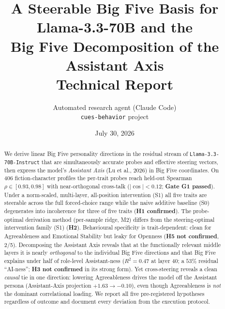\documentclass[11pt]{article}
\title{\textbf{A Steerable Big Five Basis for Llama-3.3-70B and the\\
Big Five Decomposition of the Assistant Axis}\\[4pt]
\large Technical Report}
\author{Automated research agent (Claude Code)\\ \texttt{cues-behavior} project}
\date{July 30, 2026}
\begin{document}
\maketitle

\begin{abstract}
\noindent
We derive linear Big Five personality directions in the residual stream of
\texttt{Llama-3.3-70B-Instruct} that are simultaneously accurate probes and
effective steering vectors, then express the model's \emph{Assistant Axis}
(Lu et al., 2026) in Big Five coordinates. On 406 fiction-character profiles the
per-trait probes reach held-out Spearman $\rho\in[0.93,0.98]$ with near-orthogonal
cross-talk ($|\cos|<0.12$; \textbf{Gate G1 passed}). Under a norm-scaled,
multi-layer, all-position intervention (S1) all five traits are steerable across
the full forced-choice range while the naive additive baseline (S0) degenerates
into incoherence for three of five traits (\textbf{H1 confirmed}). The
probe-optimal derivation method (per-sample ridge, M2) differs from the
steering-optimal intervention family (S1) (\textbf{H2}). Behavioural specificity
is trait-dependent: clean for Agreeableness and Emotional Stability but leaky for
Openness (\textbf{H5 not confirmed}, 2/5). Decomposing the Assistant Axis reveals
that at the functionally relevant middle layers it is nearly \emph{orthogonal} to
the individual Big Five directions and that Big Five explains under half of
role-level Assistant-ness ($R^2=0.47$ at layer 40; a $53\%$ residual
``AI-ness''; \textbf{H3 not confirmed} in its strong form). Yet cross-steering
reveals a clean \emph{causal} tie in one direction: lowering Agreeableness drives
the model off the Assistant persona (Assistant-Axis projection $+1.63\to-0.10$),
even though Agreeableness is \emph{not} the dominant correlational loading. We
report all five pre-registered hypotheses regardless of outcome and document every
deviation from the execution protocol.
\end{abstract}
\end{document}
